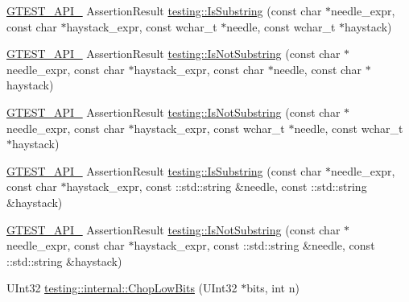 \begin{DoxyCompactItemize}
\item 
\mbox{\hyperlink{_obj__test_2lib_2googletest-release-1_88_81_2googletest_2include_2gtest_2internal_2gtest-port_8h_aa73be6f0ba4a7456180a94904ce17790}{G\+T\+E\+S\+T\+\_\+\+A\+P\+I\+\_\+}} Assertion\+Result \mbox{\hyperlink{namespacetesting_aa1c82529c7591d2a9fd016de45dd9113}{testing\+::\+Is\+Substring}} (const char $\ast$needle\+\_\+expr, const char $\ast$haystack\+\_\+expr, const wchar\+\_\+t $\ast$needle, const wchar\+\_\+t $\ast$haystack)
\item 
\mbox{\hyperlink{_obj__test_2lib_2googletest-release-1_88_81_2googletest_2include_2gtest_2internal_2gtest-port_8h_aa73be6f0ba4a7456180a94904ce17790}{G\+T\+E\+S\+T\+\_\+\+A\+P\+I\+\_\+}} Assertion\+Result \mbox{\hyperlink{namespacetesting_a2288dcf4249f88af67dcd46544dc49a6}{testing\+::\+Is\+Not\+Substring}} (const char $\ast$needle\+\_\+expr, const char $\ast$haystack\+\_\+expr, const char $\ast$needle, const char $\ast$haystack)
\item 
\mbox{\hyperlink{_obj__test_2lib_2googletest-release-1_88_81_2googletest_2include_2gtest_2internal_2gtest-port_8h_aa73be6f0ba4a7456180a94904ce17790}{G\+T\+E\+S\+T\+\_\+\+A\+P\+I\+\_\+}} Assertion\+Result \mbox{\hyperlink{namespacetesting_a53e5c6e91ea429c43de7f4f57e33d166}{testing\+::\+Is\+Not\+Substring}} (const char $\ast$needle\+\_\+expr, const char $\ast$haystack\+\_\+expr, const wchar\+\_\+t $\ast$needle, const wchar\+\_\+t $\ast$haystack)
\item 
\mbox{\hyperlink{_obj__test_2lib_2googletest-release-1_88_81_2googletest_2include_2gtest_2internal_2gtest-port_8h_aa73be6f0ba4a7456180a94904ce17790}{G\+T\+E\+S\+T\+\_\+\+A\+P\+I\+\_\+}} Assertion\+Result \mbox{\hyperlink{namespacetesting_a571c7edcfc574269833ebe3e7d338ec5}{testing\+::\+Is\+Substring}} (const char $\ast$needle\+\_\+expr, const char $\ast$haystack\+\_\+expr, const \+::std\+::string \&needle, const \+::std\+::string \&haystack)
\item 
\mbox{\hyperlink{_obj__test_2lib_2googletest-release-1_88_81_2googletest_2include_2gtest_2internal_2gtest-port_8h_aa73be6f0ba4a7456180a94904ce17790}{G\+T\+E\+S\+T\+\_\+\+A\+P\+I\+\_\+}} Assertion\+Result \mbox{\hyperlink{namespacetesting_abe7b3fa1c9528745f934d4a14155ea87}{testing\+::\+Is\+Not\+Substring}} (const char $\ast$needle\+\_\+expr, const char $\ast$haystack\+\_\+expr, const \+::std\+::string \&needle, const \+::std\+::string \&haystack)
\item 
U\+Int32 \mbox{\hyperlink{namespacetesting_1_1internal_a2c54b453387aa8a18f2f3e09f10b5a7d}{testing\+::internal\+::\+Chop\+Low\+Bits}} (U\+Int32 $\ast$bits, int n)

\end{DoxyCompactItemize}
